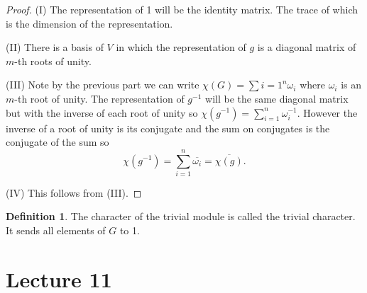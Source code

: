 \documentclass[11pt, notitlepage]{article}
\numberwithin{equation}{section}
\theoremstyle{plain}
\theoremstyle{definition}
\newtheorem{definition}[theorem]{Definition}
\begin{document}
\begin{proof}
(I) The representation of 1 will be the identity matrix. The trace of which is the dimension of the representation.

(II) There is a basis of $V$ in which the representation of $g$ is a diagonal matrix of $m$-th roots of unity.

(III) Note by the previous part we can write $\chi(G) = \sum{i=1}^n\omega_i$ where $\omega_i$ is an $m$-th root of unity. The representation of $g^{-1}$ will be the same diagonal matrix but with the inverse of each root of unity so $\chi(g^{-1}) = \sum_{i=1}^n \omega_i^{-1}$. However the inverse of a root of unity is its conjugate and the sum on conjugates is the conjugate of the sum so
\[
	\chi(g^{-1}) = \sum_{i=1}^n\overline{\omega_i} =\overline{\chi(g)}.
\]

(IV) This follows from (III).
\end{proof}

\begin{definition}
The character of the trivial module is called the trivial character. It sends all elements of $G$ to 1. 
\end{definition}





\section{Lecture 11}
\end{document}
